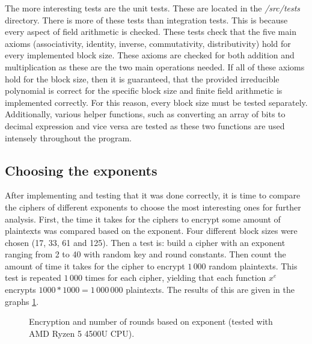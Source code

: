 \documentclass{Resources/UoBLab1}
\theoremstyle{definition}
\begin{document}
The more interesting tests are the unit tests. These are located in the \textit{/src/tests} directory. There is more of these tests than integration tests. This is because every aspect of field arithmetic is checked. These tests check that the five main axioms (associativity, identity, inverse, commutativity, distributivity) hold for every implemented block size. These axioms are checked for both addition and multiplication as these are the two main operations needed. If all of these axioms hold for the block size, then it is guaranteed, that the provided irreducible polynomial is correct for the specific block size and finite field arithmetic is implemented correctly. For this reason, every block size must be tested separately. Additionally, various helper functions, such as converting an array of bits to decimal expression and vice versa are tested as these two functions are used intensely throughout the program.

\subsection{Choosing the exponents}\label{sub:choosing-exponents}
After implementing and testing that it was done correctly, it is time to compare the ciphers of different exponents to choose the most interesting ones for further analysis. First, the time it takes for the ciphers to encrypt some amount of plaintexts was compared based on the exponent. Four different block sizes were chosen (17, 33, 61 and 125). Then a test is: build a cipher with an exponent ranging from 2 to 40 with random key and round constants. Then count the amount of time it takes for the cipher to encrypt $1\,000$ random plaintexts. This test is repeated $1\,000$ times for each cipher, yielding that each function $x^e$ encrypts $1000*1000=1\,000\,000$ plaintexts. The results of this are given in the graphs \ref{fig:enc-exponent}.

\begin{figure}
    \caption{Encryption and number of rounds based on exponent (tested with AMD Ryzen 5 4500U CPU).}\label{fig:enc-exponent}
    \hspace{-1cm}
    \centering
    \begin{minipage}{0.5\textwidth}
        \centering
        
    \end{minipage}\hfill
    \begin{minipage}{0.5\textwidth}
        \centering
        
    \end{minipage}

    \hspace{-1cm}
    \begin{minipage}{0.5\textwidth}
        \centering
        
    \end{minipage}\hfill
    \begin{minipage}{0.5\textwidth}
        \centering
        
    \end{minipage}
    \vspace{-1cm}
\end{figure}
\end{document}
